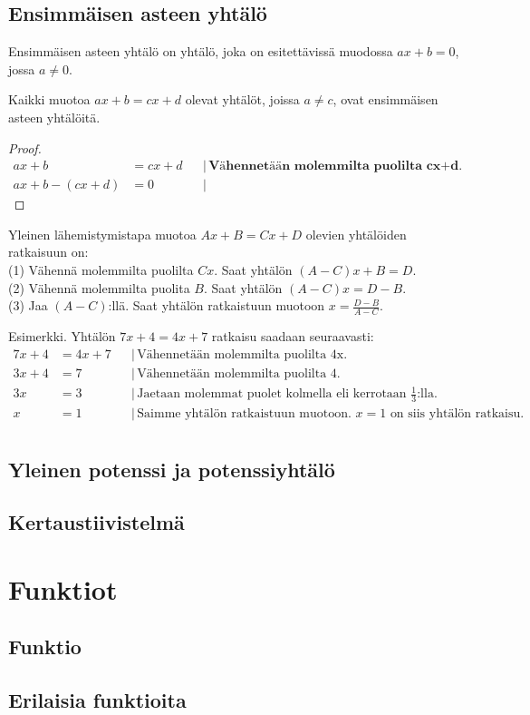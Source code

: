 \chapter{Ensimmäisen asteen yhtälö}
Ensimmäisen asteen yhtälö on yhtälö, joka on esitettävissä muodossa $ax+b=0$, jossa $a \neq 0$.

\begin{theorem}
Kaikki muotoa $ax+b=cx+d$ olevat yhtälöt, joissa $a \neq c$, ovat ensimmäisen asteen yhtälöitä.
\end{theorem}

\begin{proof}
\begin{align*}
ax+b &= cx+d & &| \, \textbf{Vähennetään molemmilta puolilta cx+d.} \\
ax+b - (cx+d) &= 0 & &|
\end{align*}
\end{proof}

\begin{theorem}
Yleinen lähemistymistapa muotoa $Ax+B = Cx+D$ olevien yhtälöiden ratkaisuun on: \\
(1) Vähennä molemmilta puolilta $Cx$. Saat yhtälön $(A-C)x + B = D$. \\
(2) Vähennä molemmilta puolita $B$. Saat yhtälön $(A-C)x = D-B$. \\
(3) Jaa $(A-C)$:llä. Saat yhtälön ratkaistuun muotoon $x = \frac{D-B}{A-C}$.
\end{theorem}

Esimerkki. Yhtälön $7x+4=4x+7$ ratkaisu saadaan seuraavasti:
\begin{align*}
7x+4 &= 4x+7 & &| \, \text{Vähennetään molemmilta puolilta 4x.} \\
3x+4 &= 7 & &| \, \text{Vähennetään molemmilta puolilta 4.} \\
3x &= 3 & &| \, \text{Jaetaan molemmat puolet kolmella eli kerrotaan $\frac{1}{3}$:lla.} \\
x &= 1 & &| \, \text{Saimme yhtälön ratkaistuun muotoon. $x=1$ on siis yhtälön ratkaisu.} \\
\end{align*}

\chapter{Yleinen potenssi ja potenssiyhtälö}
\chapter{Kertaustiivistelmä}

\part{Funktiot}
\chapter{Funktio}
\chapter{Erilaisia funktioita}